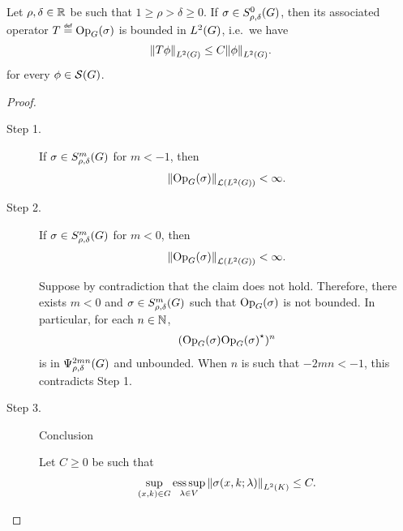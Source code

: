 \begin{proposition}[$L^2$ boundedness]
    Let $\rho, \delta \in \R$ be such that $1 \geq \rho > \delta \geq 0$.
    If $\sigma \in \SymbolClass 0 {\rho, \delta}$,
    then its associated operator $T \defeq \Op(\sigma)$ is bounded in $\Lebesgue 2 \Group$,
    i.e.\ we have
    \begin{align*}
        \norm [\Lebesgue 2 \Group] {T \phi} \leq C \norm [\Lebesgue 2 \Group] \phi.
    \end{align*}
    for every $\phi \in \Schwartz \Group$.
\end{proposition}
\begin{proof}
    \begin{description}
        \item[Step 1.] If $\sigma \in \SymbolClass m {\rho, \delta}$ for $m < -1$, then
            \begin{align*}
                \norm [\Lin{\Lebesgue 2 \Group}] {\Op(\sigma)} < \infty.
            \end{align*}
        \item[Step 2.] If $\sigma \in \SymbolClass m {\rho, \delta}$ for $m < 0$, then
            \begin{align*}
                \norm [\Lin{\Lebesgue 2 \Group}] {\Op(\sigma)} < \infty.
            \end{align*}

            Suppose by contradiction that the claim does not hold.
            Therefore, there exists $m < 0$ and $\sigma \in \SymbolClass m {\rho, \delta}$ such that
            $\Op(\sigma)$ is not bounded.
            In particular, for each $n \in \N$,
            \begin{align*}
                (\Op(\sigma) \adj {\Op(\sigma)})^n
            \end{align*}
            is in $\OperatorClass {2 m n} {\rho, \delta}$ and unbounded.
            When $n$ is such that $-2 m n < -1$, this contradicts Step 1.
        \item[Step 3.] Conclusion

            Let $C \geq 0$ be such that
            \begin{align*}
                \sup_{(x, k) \in \Group} \esssup_{\lambda \in \VectorSpace} \norm [\Lebesgue 2 \CompactGroup] {\sigma(x, k; \lambda)} \leq C.
            \end{align*}


\end{description}
\end{proof}

